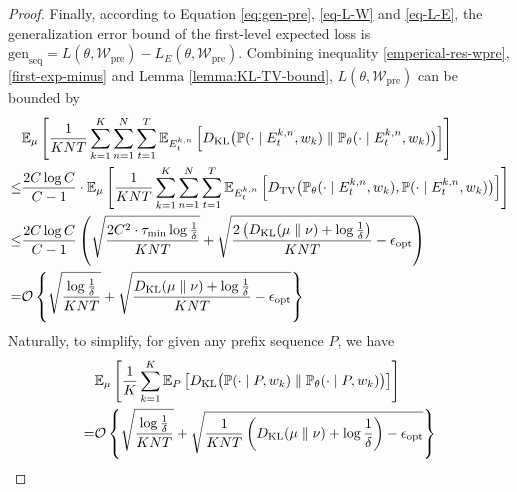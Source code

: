 \begin{proof}
	Finally, according to Equation \ref{eq:gen-pre}, \ref{eq-L-W} and \ref{eq-L-E}, the generalization error bound of the first-level expected loss is $
	\text{gen}_\text{seq}=L(\theta,\mathcal{W}_{\text{pre}})-L_E(\theta,\mathcal{W}_{\text{pre}})$. Combining inequality \ref{emperical-res-wpre}, \ref{first-exp-minus} and Lemma \ref{lemma:KL-TV-bound}, $L(\theta,\mathcal{W}_{\text{pre}})$ can be bounded by
	\begin{align}
		&\mathbb{E}_{\mu}\left[\frac{1}{KNT}\sum_{k=1}^K\sum_{n=1}^N\sum_{t=1}^T\mathbb{E}_{E^{k,n}_t}\left[D_{\mathrm{KL}}\big(\mathbb{P}(\cdot\mid E^{k,n}_t,w_k) \parallel \mathbb{P}_{\theta}(\cdot\mid E^{k,n}_t,w_k)\big)\right]\right]\nonumber\\
		\leq & \frac{2C\log C}{C-1}\cdot \mathbb{E}_{\mu}\left[\frac{1}{KNT}\sum_{k=1}^K\sum_{n=1}^N\sum_{t=1}^T\mathbb{E}_{E^{k,n}_t}\left[D_{\mathrm{TV}}\big(\mathbb{P}_{\theta}(\cdot\mid E^{k,n}_t,w_k),\mathbb{P}(\cdot\mid E^{k,n}_t,w_k)\big)\right]\right]\nonumber\\
		\leq& \frac{2C\log C}{C-1}\left(\sqrt{\frac{2C^2\cdot \tau_{\min}\log \frac{1}{\delta}}{KNT}}+\sqrt{\frac{2\left(D_{\mathrm{KL}}(\mu\parallel \nu)+\operatorname{log}\frac{1}{\delta}\right)}{KNT}-\epsilon_{\text{opt}}}\right) \nonumber\\	
		=&\mathcal{O}\left\{\sqrt{\frac{\log \frac{1}{\delta}}{KNT}}+\sqrt{\frac{D_{\mathrm{KL}}(\mu\parallel \nu)+\operatorname{log}\frac{1}{\delta}}{KNT}-\epsilon_{\text{opt}}}\right\}
	\end{align}
    Naturally, to simplify, for given any prefix sequence $P$, we have
    \begin{align}
		&\mathbb{E}_{\mu}\left[\frac{1}{K}\sum_{k=1}^K\mathbb{E}_{P}\left[D_{\mathrm{KL}}\big(\mathbb{P}(\cdot\mid P,w_k) \parallel \mathbb{P}_{\theta}(\cdot\mid P,w_k)\big)\right]\right] \nonumber \\
		=&\mathcal{O}\left\{\sqrt{\frac{\log \frac{1}{\delta}}{KNT}}+\sqrt{\frac{1}{KNT}\left(D_{\mathrm{KL}}(\mu\parallel \nu)+\operatorname{log}\frac{1}{\delta}\right)-\epsilon_{\text{opt}}}\right\}
	\end{align}
\end{proof}


